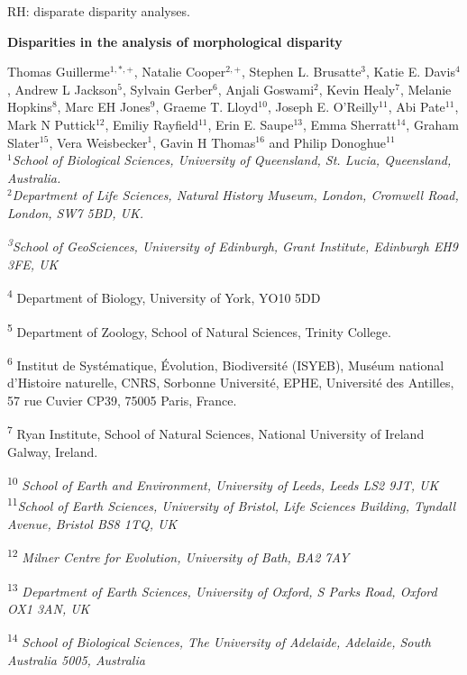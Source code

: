 RH: disparate disparity analyses.

\textbf{Disparities in the analysis of morphological disparity}

Thomas Guillerme\({}^{1,*, +}\), Natalie Cooper\({}^{2, +}\), Stephen L.
Brusatte\({}^{3}\), Katie E. Davis\({}^{4}\), Andrew L
Jackson\({}^{5}\), Sylvain Gerber\({}^{6}\), Anjali Goswami\({}^{2}\),
Kevin Healy\({}^{7}\), Melanie Hopkins\({}^{8}\), Marc EH
Jones\({}^{9}\), Graeme T. Lloyd\({}^{10}\), Joseph E.
O'Reilly\({}^{11}\), Abi Pate\({}^{11}\), Mark N Puttick\({}^{12}\),
Emiliy Rayfield\({}^{11}\), Erin E. Saupe\({}^{13}\), Emma
Sherratt\({}^{14}\), Graham Slater\({}^{15}\), Vera
Weisbecker\({}^{1}\), Gavin H Thomas\({}^{16}\) and Philip
Donoghue\({}^{11}\)\\
\({}^{1}\)\emph{School of Biological Sciences, University of Queensland,
St. Lucia, Queensland, Australia.}\\
\({}^{2}\)\emph{Department of Life Sciences, Natural History Museum,
London, Cromwell Road, London, SW7 5BD, UK.}

\emph{\textsuperscript{3}School of GeoSciences, University of Edinburgh,
Grant Institute, Edinburgh EH9 3FE, UK}

\textsuperscript{4} Department of Biology, University of York, YO10 5DD

\textsuperscript{5} Department of Zoology, School of Natural Sciences,
Trinity College.

\textsuperscript{6} Institut de Systématique, Évolution, Biodiversité
(ISYEB), Muséum national d'Histoire naturelle, CNRS, Sorbonne
Université, EPHE, Université des Antilles, 57 rue Cuvier CP39, 75005
Paris, France.

\textsuperscript{7} Ryan Institute, School of Natural Sciences, National
University of Ireland Galway, Ireland.

\textsuperscript{10} \emph{School of Earth and Environment, University
of Leeds, Leeds LS2 9JT, UK}\\
\textsuperscript{11}\emph{School of Earth Sciences, University of
Bristol, Life Sciences Building, Tyndall Avenue, Bristol BS8 1TQ, UK}

\textsuperscript{12} \emph{Milner Centre for Evolution, University of
Bath, BA2 7AY}

\textsuperscript{13} \emph{Department of Earth Sciences, University of
Oxford, S Parks Road, Oxford OX1 3AN, UK}

\textsuperscript{14} \emph{School of Biological Sciences, The University
of Adelaide, Adelaide, South Australia 5005, Australia}

